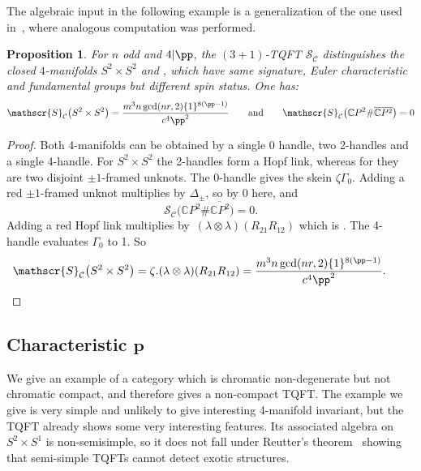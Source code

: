 \documentclass[10pt,a4paper]{amsart}
\newtheorem{proposition}{Proposition}
\numberwithin{equation}{section}
\numberwithin{theorem}{section}
\numberwithin{proposition}{section}
\numberwithin{definition}{section}
\numberwithin{lemma}{section}
\numberwithin{corollary}{section}
\numberwithin{remark}{section}
\numberwithin{example}{section}
\newcommand{\cat}{\mathcal{C}}
\newcommand{\C}{\ensuremath{\mathbb{C}}}
\newcommand{\TSkein}{{\mathscr{S}}}
\newcounter{exo} \newcounter{numexercice}
\begin{document}
The algebraic input in the following example is
a generalization of the one used in~\cite{BD22}, where analogous
computation was performed.
\begin{proposition}
 For $n$ odd and $4\vert {\pp}$, the $(3+1)$-TQFT $\TSkein_\cat$
 distinguishes the closed $4$-manifolds $S^2\times S^2$ and
 \smash{$\C P^2\#\overline{\C P^2}$}, which have same signature, Euler
 characteristic and fundamental groups but different spin status. One
 has: %
 \[\TSkein_\cat\bigl(S^2\times S^2\bigr)= \frac{m^3n \gcd(nr,2)\{1\}^{8({\pp}-1)}}{c^4{\pp}^2}
 \qquad\text{and}\qquad \TSkein_\cat\bigl(\C P^2\#\overline{\C P^2}\bigr)=0\]
\end{proposition}
\begin{proof}
 Both 4-manifolds can be obtained by a single 0 handle, two 2-handles
 and a single 4-handle. For $S^2\times S^2$ the 2-handles form a Hopf
 link, whereas for \smash{$\C P^2\#\overline{\C P^2}$} they are two disjoint
 $\pm1$-framed unknots. The 0-handle gives the skein
 $\zeta \Gamma_0$. Adding a red $\pm1$-framed unknot multiplies by
 $\Delta_\pm$, so by 0 here, and
\[
\TSkein_\cat\bigl(\C P^2\#\overline{\C P^2}\bigr)=0.
\]
 Adding a red Hopf link
 multiplies by~$(\lambda \otimes \lambda)(R_{21}R_{12})$ which is
. The 4-handle
 evaluates $\Gamma_0$ to 1. So
 \[
 \TSkein_\cat\bigl(S^2\times S^2\bigr)= \zeta. (\lambda \otimes
 \lambda)(R_{21}R_{12}) = \frac{m^3n\gcd(nr,2)\{1\}^{8({\pp}-1)}}{c^4{\pp}^2}.
\tag*{\qed}
\]
\renewcommand{\qed}{}
\end{proof}

\subsection[Characteristic p]{Characteristic $\boldsymbol{p}$}\label{SS:Ex-chp}
We give an example of a category which is chromatic non-degenerate but
not chromatic compact, and therefore gives a non-compact TQFT. The
example we give is very simple and unlikely to give interesting
4-manifold invariant, but the TQFT already shows some very interesting
features. Its associated algebra on $S^2\times S^1$ is non-semisimple,
so it does not fall under Reutter's theorem~\cite{Reutter} showing
that semi-simple TQFTs cannot detect exotic structures.
\end{document}

